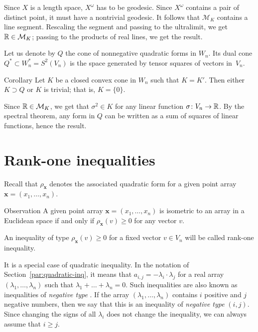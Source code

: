 \documentclass[a4paper,10pt]{article}
\begin{document}
Since  $X$ is a length space, $X^\omega$ has to be geodesic.
Since $X^\omega$ contains a pair of distinct point, it must have a nontrivial geodesic.
It follows that $\mathcal{M}_K$ contains a line segment.
Rescaling the segment and passing to the ultralimit, we get $\mathbb{R}\in \mathcal{M}_K$;
passing to the products of real lines, we get the result.
\qeds

Let us denote by $Q$ the cone of nonnegative quadratic forms in $W_n$.
Its dual cone $Q^*\subset W_n^*=S^2(V_n)$ is the space generated by tensor squares of vectors in~$V_n$.

\begin{thm}{Corollary}
Let $K$ be a closed convex cone in $W_n$ such that $K=K'$.
Then either $K\supset Q$ or $K$ is trivial; that is, $K=\{0\}$.
\end{thm}

Since $\mathbb{R}\in \mathcal{M}_K$, we get that $\sigma^2\in K$ for any linear function $\sigma\colon V_n\to\mathbb{R}$.
By the spectral theorem, any form in $Q$ can be written as a sum of squares of linear functions, hence the result.
\qeds

\section{Rank-one inequalities}\label{par:rank-one}
Recall that $\rho_{\bm{x}}$ denotes the associated quadratic form for a given point array $\bm{x}=(x_1,\dots,x_n)$.

\begin{thm}{Observation}\label{obs:rank-one}
A given point array $\bm{x}=(x_1,\dots,x_n)$ is isometric to an array in a Euclidean space if and only if $\rho_{\bm{x}}(v)\ge 0$ for any vector $v$.
\end{thm}

An inequality of type $\rho_{\bm{x}}(v)\ge 0$ for a fixed vector $v\in V_n$ will be called rank-one inequality.

It is a special case of quadratic inequality.
In the notation of Section~\ref{par:quadratic-inq}, it means that $a_{i,j}=-\lambda_i\cdot\lambda_j$ for a real array $(\lambda_1,\dots, \lambda_n)$ such that
$\lambda_1+\dots+\lambda_n=0$.
Such inequalities are also known as inequalities of \emph{negative type} \cite{deza-lauren}.
If the array $(\lambda_1,\dots, \lambda_n)$ contains $i$ positive and $j$ negative numbers,
then we say that this is an inequality of \emph{negative type} $(i,j)$.
Since changing the signs of all $\lambda_i$ does not change the inequality, we can always assume that $i\ge j$.
\end{document}
